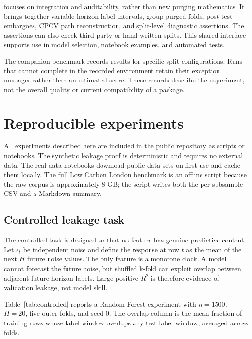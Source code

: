 \documentclass[article]{jdssv}
\newcommand{\pcv}{\pkg{purgedcv}}
\begin{document}
\pcv{} focuses on integration and auditability, rather than new purging
mathematics. It brings together variable-horizon label intervals, group-purged
folds, post-test embargoes, CPCV path reconstruction, and split-level diagnostic
assertions. The assertions can also check third-party or hand-written splits.
This shared interface supports use in  model selection,
notebook examples, and automated tests.

The companion benchmark records results for specific split configurations.
Runs that cannot complete in the recorded environment retain their exception
messages rather than an estimated score. These records describe the experiment,
not the overall quality or current compatibility of a package.

\section{Reproducible experiments}

All experiments described here are included in the public repository as scripts
or notebooks. The synthetic leakage proof is deterministic and requires no
external data. The real-data notebooks download public data sets on first use
and cache them locally. The full Low Carbon London benchmark is an offline
script because the raw corpus is approximately 8 GB; the script writes both the
per-subsample CSV and a Markdown summary.

\subsection{Controlled leakage task}

The controlled task is designed so that no feature has genuine predictive
content. Let $\epsilon_t$ be independent noise and define the response at row
$t$ as the mean of the next $H$ future noise values. The only feature is a
monotone clock. A model cannot forecast the future noise, but shuffled k-fold
can exploit overlap between adjacent future-horizon labels. Large positive
$R^2$ is therefore evidence of validation leakage, not model skill.

Table~\ref{tab:controlled} reports a Random Forest experiment with $n=1500$,
$H=20$, five outer folds, and seed 0. The overlap column is the mean fraction
of training rows whose label window overlaps any test label window, averaged
across folds.
\end{document}

